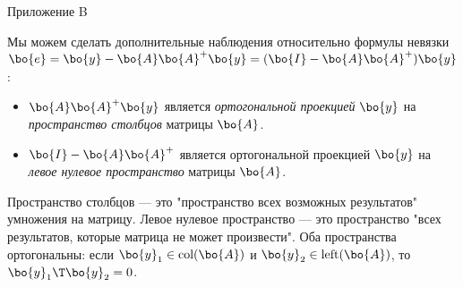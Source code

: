 \documentclass{beamer}
\begin{document}
\begin{frame}{Приложение B}
	\begin{flushleft}
		
		Мы можем сделать дополнительные наблюдения относительно формулы невязки $\bo{e} = \bo{y} - \bo{A}\bo{A}^+\bo{y} = (\bo{I} - \bo{A}\bo{A}^+)\bo{y} $:
		
		\begin{itemize}
			
			\item $\bo{A}\bo{A}^+\bo{y}$ является \emph{ортогональной проекцией} $\bo{y}$ на \emph{пространство столбцов} матрицы $\bo{A}$.
		
		\item $\bo{I} - \bo{A}\bo{A}^+$ является ортогональной проекцией $\bo{y}$ на \emph{левое нулевое пространство} матрицы $\bo{A}$.
	\end{itemize}
	
	Пространство столбцов — это "пространство всех возможных результатов" умножения на матрицу. Левое нулевое пространство — это пространство "всех результатов, которые матрица не может произвести". Оба пространства ортогональны: если $\bo{y}_1 \in \text{col}(\bo{A})$ и $\bo{y}_2 \in \text{left}(\bo{A})$, то $\bo{y}_1\T \bo{y}_2  = 0$.
	
\end{flushleft}
\end{frame}
\end{document}
